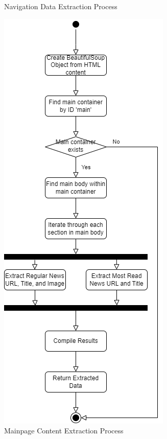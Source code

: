\documentclass[10pt]{article}
\begin{document}
\begin{figure}[htbp]
\begin{minipage}[t]{0.35\textwidth}
        \caption{Navigation Data Extraction Process}
        \label{fig:navbar}
    \end{minipage}
    \hfill
    \begin{minipage}[t]{0.4\textwidth}
        \includegraphics[width=\textwidth]{../FlowChart_Main.png}
        \caption{Mainpage Content Extraction Process}
        \label{fig:maincontent}
    \end{minipage}
    \hfill
\end{figure}
\end{document}
